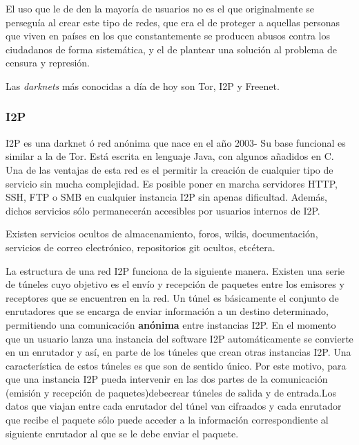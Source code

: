 El uso que le de den la mayoría de usuarios no es el que originalmente
se perseguía al crear este tipo de redes, que era el de proteger a
aquellas personas que viven en países en los que constantemente se
producen abusos contra los ciudadanos de forma sistemática, y el de
plantear una solución al problema de censura y represión.

Las \textit{darknets} más conocidas a día de hoy son Tor, I2P y Freenet.

\subsubsection {I2P}

I2P es una darknet ó red anónima que nace en el año 2003- Su base funcional es similar a la de Tor. Está escrita en lenguaje Java, con algunos añadidos en C. 
Una de las ventajas de esta red es el permitir la creación de cualquier tipo de servicio sin mucha complejidad. Es posible poner en marcha servidores HTTP, SSH, FTP o SMB en cualquier instancia I2P sin apenas dificultad. Además, dichos servicios sólo permanecerán accesibles por usuarios internos de I2P.

Existen servicios ocultos de almacenamiento, foros, wikis, documentación, servicios de correo electrónico, repositorios git ocultos, etcétera.

La estructura de una red I2P funciona de la siguiente manera.
Existen una serie de túneles cuyo objetivo es el envío y recepción de paquetes entre los emisores y receptores que se encuentren en la red. Un túnel es básicamente el conjunto de enrutadores que se encarga de enviar información a un destino determinado, permitiendo una comunicación \textbf{anónima} entre instancias I2P.
En el momento que un usuario lanza una instancia del software I2P automáticamente se convierte en un enrutador y así, en parte de los túneles que crean otras instancias I2P.
Una característica de estos túneles es que son de sentido único. Por este motivo, para que una instancia I2P pueda intervenir en las dos partes de la comunicación (emisión y recepción de paquetes)debecrear túneles de salida y de entrada.Los datos que viajan entre cada enrutador del túnel van cifraados y cada enrutador que recibe el paquete sólo puede acceder a la información correspondiente al siguiente enrutador al que se le debe enviar el paquete.

